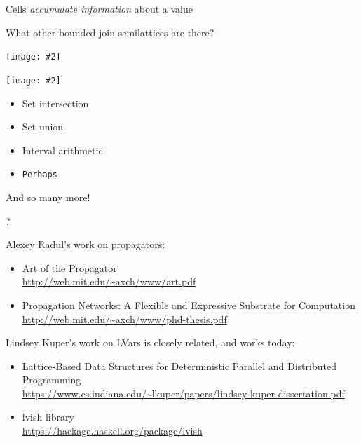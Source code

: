 \documentclass[usenames,dvipsnames,svgnames,table,aspectratio=1610,mathserif]{beamer}
\newcommand{\nl}{\vspace{\baselineskip}}
\newcommand{\pnl}{\pause \nl}
\newcommand{\textslide}[1]{{
\begin{frame}
\begin{center}

#1

\end{center}
\end{frame}
}}
\newcommand{\textslideleft}[1]{{
\begin{frame}

#1

\end{frame}
}}
\newcommand{\imageslide}[2][1]{{
\begin{frame}\begin{center}
\texttt{[image: \#2]}
\end{center}\end{frame}
}}
\begin{document}




\textslide{\Large{Cells {\it accumulate information} about a value}}









\textslide{
  What other bounded join-semilattices are there?
}

\imageslide[0.7]{powerset.pdf}
\imageslide[0.7]{powerset-upside-down.pdf}

\textslideleft{

  \begin{itemize}
    \item Set intersection
    \item Set union
    \item Interval arithmetic
    \item {\tt Perhaps}
  \end{itemize}

  \nl

  And so many more!

  \pnl

}





\textslide{\centering {\Huge ?}}


\begin{frame}

Alexey Radul's work on propagators:

\begin{itemize}
\item Art of the Propagator \\
      \url{http://web.mit.edu/~axch/www/art.pdf}
\item Propagation Networks: A Flexible and Expressive Substrate for Computation \\
      \url{http://web.mit.edu/~axch/www/phd-thesis.pdf}
\end{itemize}
\end{frame}


\textslideleft{

Lindsey Kuper's work on LVars is closely related, and works today:

\begin{itemize}
\item Lattice-Based Data Structures for Deterministic Parallel and Distributed Programming \\
      \url{https://www.cs.indiana.edu/~lkuper/papers/lindsey-kuper-dissertation.pdf}
\item lvish library \\
      \url{https://hackage.haskell.org/package/lvish}
\end{itemize}

}
\end{document}
